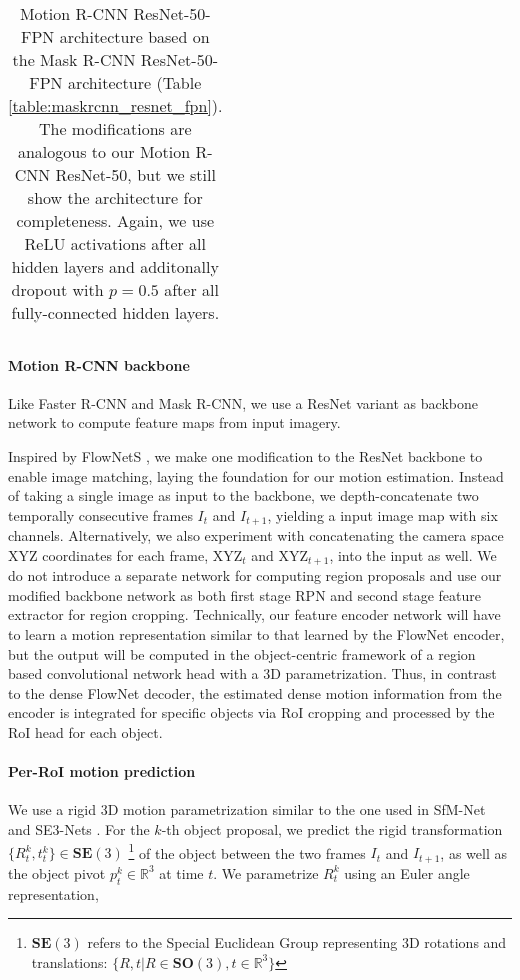 {\begin{table}[h]
\begin{tabular}{llr}
\bottomrule
\end{tabular}

\caption {
Motion R-CNN ResNet-50-FPN architecture based on the Mask R-CNN
ResNet-50-FPN architecture (Table \ref{table:maskrcnn_resnet_fpn}).
The modifications are analogous to our Motion R-CNN ResNet-50,
but we still show the architecture for completeness.
Again, we use ReLU activations after all hidden layers and
additonally dropout with $p = 0.5$ after all fully-connected hidden layers.
}
\label{table:motionrcnn_resnet_fpn}
\end{table}
}

\paragraph{Motion R-CNN backbone}
Like Faster R-CNN and Mask R-CNN, we use a ResNet \cite{ResNet} variant as backbone network to compute feature maps from input imagery.

Inspired by FlowNetS \cite{FlowNet}, we make one modification to the ResNet backbone to enable image matching,
laying the foundation for our motion estimation. Instead of taking a single image as input to the backbone,
we depth-concatenate two temporally consecutive frames $I_t$ and $I_{t+1}$, yielding a input image map with six channels.
Alternatively, we also experiment with concatenating the camera space XYZ coordinates for each frame,
XYZ$_t$ and XYZ$_{t+1}$, into the input as well.
We do not introduce a separate network for computing region proposals and use our modified backbone network
as both first stage RPN and second stage feature extractor for region cropping.
Technically, our feature encoder network will have to learn a motion representation similar to
that learned by the FlowNet encoder, but the output will be computed in the
object-centric framework of a region based convolutional network head with a 3D parametrization.
Thus, in contrast to the dense FlowNet decoder, the estimated dense motion information
from the encoder is integrated for specific objects via RoI cropping and
processed by the RoI head for each object.

\paragraph{Per-RoI motion prediction}
We use a rigid 3D motion parametrization similar to the one used in SfM-Net and SE3-Nets \cite{SfmNet,SE3Nets}.
For the $k$-th object proposal, we predict the rigid transformation $\{R_t^k, t_t^k\}\in \mathbf{SE}(3)$
\footnote{$\mathbf{SE}(3)$ refers to the Special Euclidean Group representing 3D rotations
and translations: $\{R, t|R \in \mathbf{SO}(3), t \in \mathbb{R}^3\}$}
of the object between the two frames $I_t$ and $I_{t+1}$, as well as the object pivot $p_t^k \in \mathbb{R}^3$ at time $t$.
We parametrize ${R_t^k}$ using an Euler angle representation,

